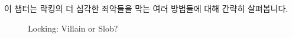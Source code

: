 이 챕터는 락킹의 더 심각한 죄악들을 막는 여러 방법들에 대해 간략히 살펴봅니다.

\begin{figure}[tb]
\centering
{}
\caption{Locking: Villain or Slob?}
\end{figure}

